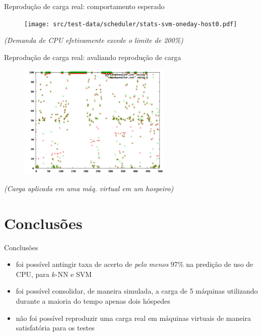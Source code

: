 \documentclass{beamer}
\begin{document}
\begin{frame}{Reprodução de carga real: comportamento esperado}
\begin{figure}
\centering
\texttt{[image: src/test-data/scheduler/stats-svm-oneday-host0.pdf]}
\end{figure}
\tiny{\emph{(Demanda de CPU efetivamente excede o limite de 200\%)}}
\end{frame}

\begin{frame}{Reprodução de carga real: avaliando reprodução de carga}
\begin{figure}
\centering
\includegraphics[height=5.5cm]{src/test-data/checking-load-simulator/load-simulator-n4.png}
\end{figure}
\tiny{\emph{(Carga aplicada em uma máq. virtual em um hospeiro)}}
\end{frame}

\section{Conclusões}

\begin{frame}{Conclusões}
\begin{itemize}
  \item foi possível antingir taxa de acerto de \emph{pelo menos} 97\% na
        predição de uso de CPU, para $k$-NN e SVM
  \item foi possível consolidar, de maneira simulada, a carga de 5 máquinas
        utilizando durante a maioria do tempo apenas dois hóspedes
  \item não foi possível reproduzir uma carga real em máquinas virtuais de
        maneira satisfatória para os testes
\end{itemize}
\end{frame}

\end{document}
